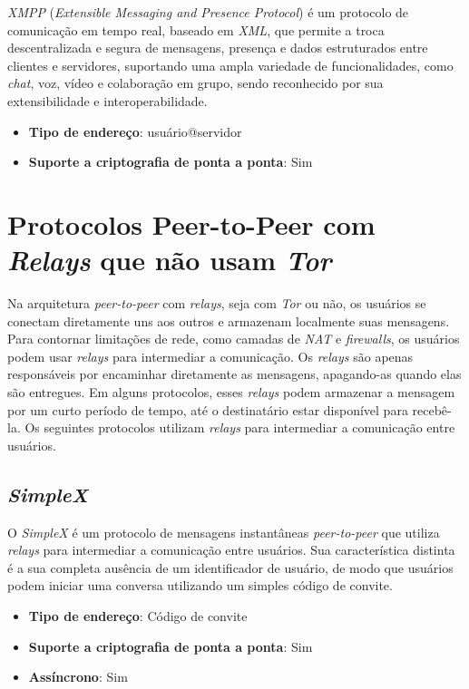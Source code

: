 \textit{XMPP} (\textit{Extensible Messaging and Presence Protocol}) é um protocolo de comunicação em tempo real, baseado em \textit{XML}, que permite a troca descentralizada e segura de mensagens, presença e dados estruturados entre clientes e servidores, suportando uma ampla variedade de funcionalidades, como \textit{chat}, voz, vídeo e colaboração em grupo, sendo reconhecido por sua extensibilidade e interoperabilidade. \cite{xmppspec}

\begin{itemize}
  \item \textbf{Tipo de endereço}: usuário@servidor
  \item \textbf{Suporte a criptografia de ponta a ponta}: Sim
\end{itemize}
\section{Protocolos Peer-to-Peer com \textit{Relays} que não usam \textit{Tor}}

Na arquitetura \textit{peer-to-peer} com \textit{relays}, seja com \textit{Tor} ou não, os usuários se conectam diretamente uns aos outros e armazenam localmente suas mensagens. Para contornar limitações de rede, como camadas de \textit{NAT} e \textit{firewalls}, os usuários podem usar \textit{relays} para intermediar a comunicação. Os \textit{relays} são apenas responsáveis por encaminhar diretamente as mensagens, apagando-as quando elas são entregues. Em alguns protocolos, esses \textit{relays} podem armazenar a mensagem por um curto período de tempo, até o destinatário estar disponível para recebê-la. Os seguintes protocolos utilizam \textit{relays} para intermediar a comunicação entre usuários.

\subsection{\textit{SimpleX}}

O \textit{SimpleX} é um protocolo de mensagens instantâneas \textit{peer-to-peer} que utiliza \textit{relays} para intermediar a comunicação entre usuários. Sua característica distinta é a sua completa ausência de um identificador de usuário, de modo que usuários podem iniciar uma conversa utilizando um simples código de convite. \cite{simplex}

\begin{itemize}
  \item \textbf{Tipo de endereço}: Código de convite
  \item \textbf{Suporte a criptografia de ponta a ponta}: Sim
  \item \textbf{Assíncrono}: Sim
\end{itemize}

